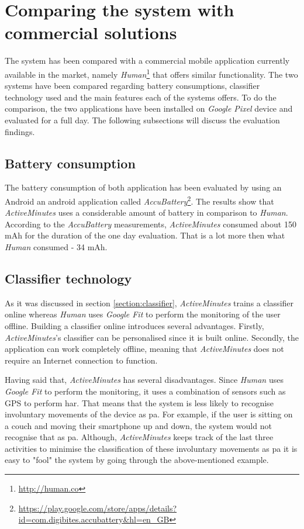 \section{Comparing the system with commercial solutions}
The system has been compared with a commercial mobile application currently available in the market, namely \textit{Human}\footnote{\url{http://human.co}} that offers similar functionality. The two systems have been compared regarding battery consumptions, classifier technology used and the main features each of the systems offers. To do the comparison, the two applications have been installed on \textit{Google Pixel} device and evaluated for a full day. The following subsections will discuss the evaluation findings.

\subsection{Battery consumption}
The battery consumption of both application has been evaluated by using an Android an android application called \textit{AccuBattery}\footnote{\url{https://play.google.com/store/apps/details?id=com.digibites.accubattery&hl=en_GB}}. The results show that \textit{ActiveMinutes} uses a considerable amount of battery in comparison to \textit{Human}. According to the \textit{AccuBattery} measurements, \textit{ActiveMinutes} consumed about 150 mAh for the duration of the one day evaluation. That is a lot more then what \textit{Human} consumed - 34 mAh.

\subsection{Classifier technology}
As it was discussed in section \ref{section:classifier}, \textit{ActiveMinutes} trains a classifier online whereas \textit{Human} uses \textit{Google Fit} to perform the monitoring of the user offline. Building a classifier online introduces several advantages. Firstly, \textit{ActiveMinutes}'s classifier can be personalised since it is built online. Secondly, the application can work completely offline, meaning that \textit{ActiveMinutes} does not require an Internet connection to function. 

Having said that, \textit{ActiveMinutes} has several disadvantages. Since \textit{Human} uses \textit{Google Fit} to perform the monitoring, it uses a combination of sensors such as GPS to perform \gls{har}. That means that the system is less likely to recognise involuntary movements of the device as \gls{pa}. For example, if the user is sitting on a couch and moving their smartphone up and down, the system would not recognise that as \gls{pa}. Although, \textit{ActiveMinutes} keeps track of the last three activities to minimise the classification of these involuntary movements as \gls{pa} it is easy to "fool" the system by going through the above-mentioned example.

